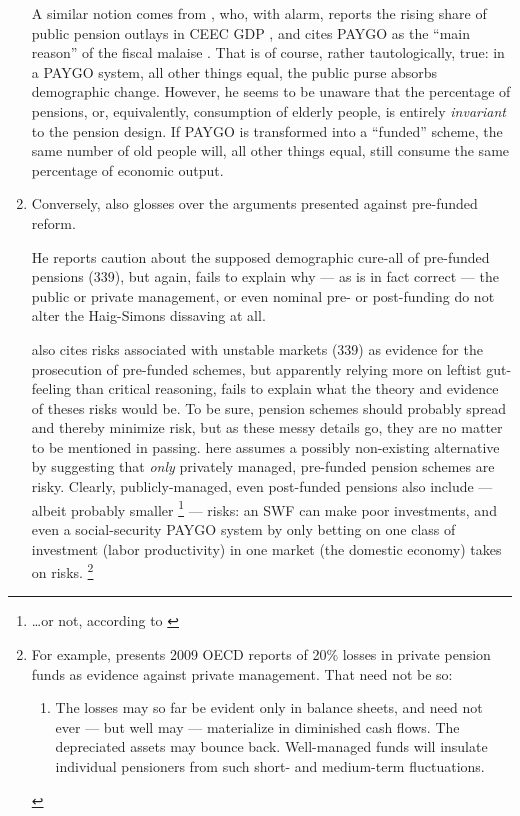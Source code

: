 \begin{enumerate}
	A similar notion comes from \cite{Bastian1998}, who, with alarm, reports the rising share of public pension outlays in \gls{CEEC} GDP \citeyearpar[69]{Bastian1998}, and cites PAYGO as the ``main reason'' of the fiscal malaise \citeyearpar[69]{Bastian1998}.
	That is of course, rather tautologically, true:
	in a PAYGO system, all other things equal, the public purse absorbs demographic change.
	However, he seems to be unaware that the percentage of pensions, or, equivalently, consumption of elderly people, is entirely \emph{invariant} to the pension design.
	If PAYGO is transformed into a ``funded'' scheme, the same number of old people will, all other things equal, still consume the same percentage of economic output.

	\item Conversely, \citeauthor{Cerami2009a} also glosses over the arguments presented against pre-funded reform.

	He reports caution about the supposed demographic cure-all of pre-funded pensions (339), but again, fails to explain why --- as is in fact correct --- the public or private management, or even nominal pre- or post-funding do not alter the Haig-Simons dissaving at all.

	\citeauthor{Cerami2009a} also cites risks associated with unstable markets (339) as evidence for the prosecution of pre-funded schemes, but apparently relying more on leftist gut-feeling than critical reasoning, fails to explain what the theory and evidence of theses risks would be.
	To be sure, pension schemes should probably spread and thereby minimize risk, but as these messy details go, they are no matter to be mentioned in passing.
	\citeauthor{Cerami2009a} here assumes a possibly non-existing alternative by suggesting that \emph{only} privately managed, pre-funded pension schemes are risky.
	Clearly, publicly-managed, even post-funded pensions also include --- albeit probably smaller
	\footnote{
		\ldots or not, according to \citet[178]{Borsch-Supan2003}
	}
	--- risks:
	an \gls{SWF} can make poor investments, and even a social-security PAYGO system by only betting on one class of investment (labor productivity) in one market (the domestic economy) takes on risks.
	\footnote{
		For example, \citeauthor{Cerami2009a} presents 2009 \gls{OECD} reports of 20\% losses in private pension funds as evidence against private management.
		That need not be so:
		\begin{enumerate}
			\item The losses may so far be evident only in balance sheets, and need not ever --- but well may --- materialize in diminished cash flows.
			The depreciated assets may bounce back.
			Well-managed funds will insulate individual pensioners from such short- and medium-term fluctuations.


\end{enumerate}}
\end{enumerate}
